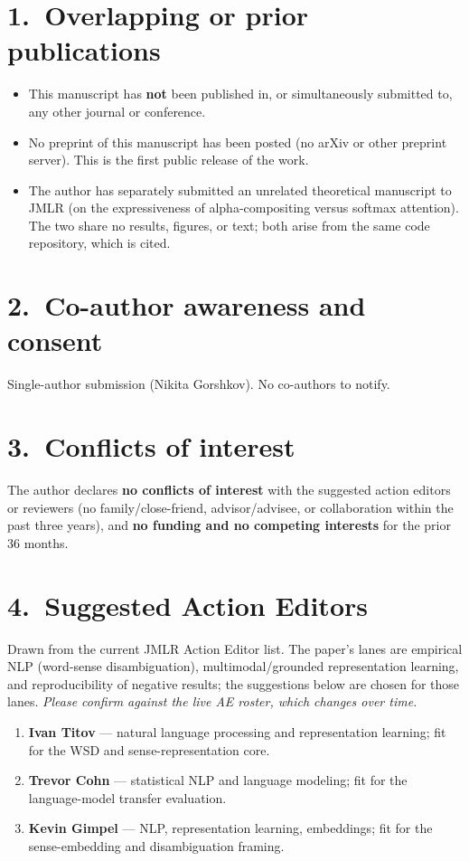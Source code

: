 \documentclass[11pt]{article}
\begin{document}
\section*{1.~Overlapping or prior publications}
\begin{itemize}[leftmargin=1.4em]
  \item This manuscript has \textbf{not} been published in, or simultaneously
    submitted to, any other journal or conference.
  \item No preprint of this manuscript has been posted (no arXiv or other
    preprint server). This is the first public release of the work.
  \item The author has separately submitted an unrelated theoretical manuscript
    to JMLR (on the expressiveness of alpha-compositing versus softmax attention).
    The two share no results, figures, or text; both arise from the same code
    repository, which is cited.
\end{itemize}

\section*{2.~Co-author awareness and consent}
Single-author submission (Nikita Gorshkov). No co-authors to notify.

\section*{3.~Conflicts of interest}
The author declares \textbf{no conflicts of interest} with the suggested action
editors or reviewers (no family/close-friend, advisor/advisee, or collaboration
within the past three years), and \textbf{no funding and no competing interests}
for the prior 36 months.

\section*{4.~Suggested Action Editors}
Drawn from the current JMLR Action Editor list. The paper's lanes are empirical
NLP (word-sense disambiguation), multimodal/grounded representation learning, and
reproducibility of negative results; the suggestions below are chosen for those
lanes. \emph{Please confirm against the live AE roster, which changes over time.}
\begin{enumerate}[leftmargin=1.6em]
  \item \textbf{Ivan Titov} --- natural language processing and representation
    learning; fit for the WSD and sense-representation core.
  \item \textbf{Trevor Cohn} --- statistical NLP and language modeling; fit for
    the language-model transfer evaluation.
  \item \textbf{Kevin Gimpel} --- NLP, representation learning, embeddings; fit
    for the sense-embedding and disambiguation framing.
\end{enumerate}
\end{document}
